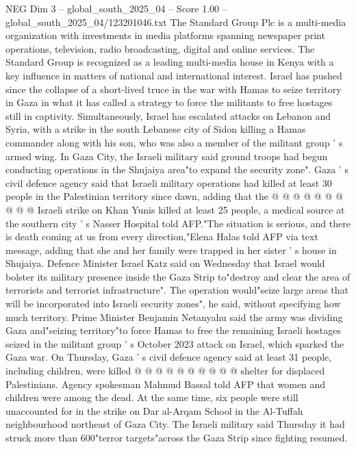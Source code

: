 \begin{textsample}{NEG Dim 3 – global\_south\_2025\_04 – Score 1.00 – global\_south\_2025\_04/123201046.txt}  \label{ex:f3_neg_348}
The Standard Group Plc is a multi-media organization with investments in media platforms spanning newspaper print operations, television, radio broadcasting, digital and online services.
The Standard Group is recognized as a leading multi-media house in Kenya with a key influence in matters of national and international interest.
Israel has pushed since the collapse of a short-lived truce in the war with Hamas to seize territory in Gaza in what it has called a strategy to force the militants to free hostages still in captivity.
Simultaneously, Israel has escalated attacks on Lebanon and Syria, with a strike in the south Lebanese city of Sidon killing a Hamas commander along with his son, who was also a member of the militant group ' s armed wing.
In Gaza City, the Israeli military said ground troops had begun conducting operations in the Shujaiya area"to expand the security zone".
Gaza ' s civil defence agency said that Israeli military operations had killed at least 30 people in the Palestinian territory since dawn, adding that the @ @ @ @ @ @ @ @ @ @ Israeli strike on Khan Yunis killed at least 25 people, a medical source at the southern city ' s Nasser Hospital told AFP."The situation is serious, and there is death coming at us from every direction,"Elena Halas told AFP via text message, adding that she and her family were trapped in her sister ' s house in Shujaiya.
Defence Minister Israel Katz said on Wednesday that Israel would bolster its military presence inside the Gaza Strip to"destroy and clear the area of terrorists and terrorist infrastructure".
The operation would"seize large areas that will be incorporated into Israeli security zones", he said, without specifying how much territory.
Prime Minister Benjamin Netanyahu said the army was dividing Gaza and"seizing territory"to force Hamas to free the remaining Israeli hostages seized in the militant group ' s October 2023 attack on Israel, which sparked the Gaza war.
On Thursday, Gaza ' s civil defence agency said at least 31 people, including children, were killed @ @ @ @ @ @ @ @ @ @ shelter for displaced Palestinians.
Agency spokesman Mahmud Bassal told AFP that women and children were among the dead.
At the same time, six people were still unaccounted for in the strike on Dar al-Arqam School in the Al-Tuffah neighbourhood northeast of Gaza City.
The Israeli military said Thursday it had struck more than 600"terror targets"across the Gaza Strip since fighting resumed.

\end{textsample}
